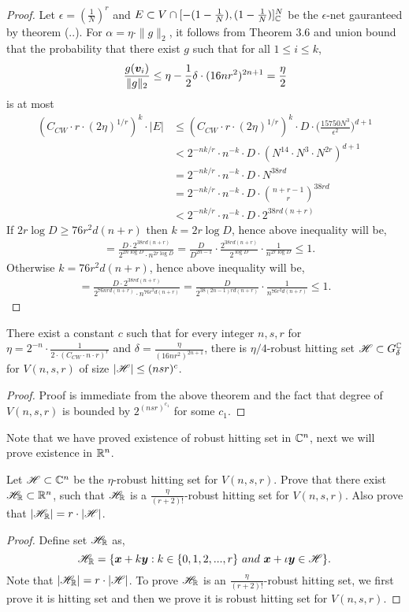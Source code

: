 {\begin{proof}
Let $\epsilon = (\frac{1}{N})^r$ and $E\subset V \cap [-(1-\frac{1}{N}),(1-\frac{1}{N})]^N_{\mathbb{C}}$ be the $\epsilon$-net gauranteed by theorem (..). For $\alpha = \eta\cdot\|g\|_2$, it follows from Theorem 3.6 and union bound that the probability that there exist $g$  such that for all $1\le i\le k$, 
$$
\frac{g(\bm v_i)}{\|g\|_2} \le \eta - \frac{1}{2}\delta \cdot (16nr^2)^{2n+1} = \frac{\eta}{2} 
$$
is at most 
\begin{align*}
(C_{CW}\cdot r \cdot (2\eta)^{1/r})^k\cdot |E| &\le (C_{CW}\cdot r \cdot (2\eta)^{1/r})^k\cdot D\cdot\Big(\frac{15750N^3}{\epsilon^2}\Big)^{d+1}\\
&< 2^{-nk/r}\cdot n^{-k}\cdot D\cdot (N^{14}\cdot N^3\cdot N^{2r})^{d+1}\\
&=2^{-nk/r}\cdot n^{-k}\cdot D\cdot N^{38rd}\\
&=2^{-nk/r}\cdot n^{-k}\cdot D\cdot \binom{n+r-1}{r}^{38rd}\\
&<2^{-nk/r}\cdot n^{-k}\cdot D\cdot 2^{38rd(n+r)}
\end{align*}
If $2r\log D \ge 76r^2d(n+r)$ then $k=2r\log D$, hence above inequality will be,
\begin{align*}
&= \frac{D\cdot 2^{38rd(n+r)}}{2^{2n\log D}\cdot n^{2r \log D}} = \frac{D}{D^{2n-1}}\cdot \frac{2^{38rd(n+r)}}{2^{\log D}}\cdot \frac{1}{n^{2r\log D}}\le 1.
\end{align*}
Otherwise $k=76r^2d(n+r)$, hence above inequality will be,
\begin{align*}
=\frac{D\cdot 2^{38rd(n+r)}}{2^{76nrd(n+r)}\cdot n^{76r^2d(n+r)}}=\frac{D}{2^{38(2n-1)rd(n+r)}}\cdot \frac{1}{n^{76r^2d(n+r)}}\le 1.
\end{align*}
\end{proof}
\begin{corollary}
There exist a constant $c$ such that for every integer $n,s,r$ for $\eta = 2^{-n}\cdot\frac{1}{2\cdot(C_{CW}\cdot n \cdot r)^r}$ and $\delta = \frac{\eta}{(16nr^2)^{2n+1}}$, there is $\eta/4$-robust hitting set $\mathscr{H}\subset G_\delta^{\mathbb{C}}$ for $V(n,s,r)$ of size $|\mathscr{H}| \le (nsr)^c$.
\end{corollary}
\begin{proof}
Proof is immediate from the above theorem and the fact that degree of $V(n,s,r)$ is bounded by $2^{(nsr)^{c_1}}$ for some $c_1$.
\end{proof}
Note that we have proved existence of robust hitting set in $\mathbb{C}^n$, next we will prove existence in $\mathbb{R}^n$.
\begin{theorem}
Let $\mathscr{H}\subset\mathbb{C}^n$ be the $\eta$-robust hitting set for $V(n,s,r)$. Prove that there exist $\mathscr{H}_{\mathbb{R}}\subset\mathbb{R}^n$, such that $\mathscr{H}_{\mathbb{R}}$ is a $\frac{\eta}{(r+2)!}$-robust hitting set for $V(n,s,r)$. Also prove that $|\mathscr{H}_{\mathbb{R}}| = r\cdot|\mathscr{H}|$.
\end{theorem}
\npara
\begin{proof}
Define set $\mathscr{H}_{\mathbb{R}}$ as,
$$
\mathscr{H}_{\mathbb{R}} = \{\bm x + k\bm y : k \in \{0,1,2,...,r\}\ {and}\ \bm x + \iota \bm y \in \mathscr{H}\}.
$$
Note that $|\mathscr{H}_{\mathbb{R}}| = r\cdot|\mathscr{H}|$. To prove $\mathscr{H}_{\mathbb{R}}$ is an $\frac{\eta}{(r+2)!}$-robust hitting set, we first prove it is hitting set and then we prove it is robust hitting set for $V(n,s,r)$. 


\end{proof}}

